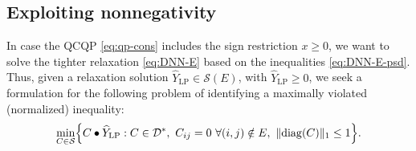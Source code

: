 \documentclass[twoside]{article}
\newcommand{\matip}[2]{#1 \bullet #2}
\begin{document}
	\subsection{Exploiting nonnegativity}
	In case the QCQP \eqref{eq:qp-cons} includes the sign restriction $x\geq 0$, we want to solve the tighter 
	relaxation \eqref{eq:DNN-E} based on the inequalities \eqref{eq:DNN-E-psd}. 
	Thus, given a relaxation solution $\widehat{Y}_{\mathrm{LP}} \in \mathcal{S}(E)$, with $\widehat{Y}_{\mathrm{LP}} \geq 0$, we seek a formulation for the following problem of identifying a maximally violated (normalized) inequality:
	\begin{equation}
		\label{eq:dnnsep-init}
		\min_{C \in \mathcal S} \Bigl\{ \matip{C}{\widehat{Y}_{\mathrm{LP}}}  : C \in \mathcal{D}^*, \ C_{ij} = 0 \ \forall(i,j) \notin E, \ \| \mathrm{diag}(C) \|_1  \leq 1 \Bigr\}.
	\end{equation}
	
\end{document}
